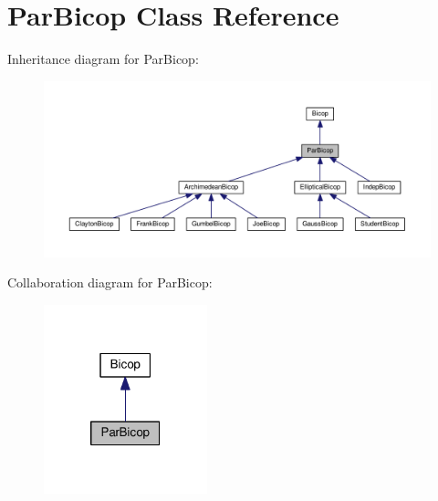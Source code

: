 \hypertarget{class_par_bicop}{\section{Par\+Bicop Class Reference}
\label{class_par_bicop}
}


Inheritance diagram for Par\+Bicop\+:\nopagebreak
\begin{figure}[H]
\begin{center}
\leavevmode
\includegraphics[width=350pt]{class_par_bicop__inherit__graph}
\end{center}
\end{figure}


Collaboration diagram for Par\+Bicop\+:\nopagebreak
\begin{figure}[H]
\begin{center}
\leavevmode
\includegraphics[width=134pt]{class_par_bicop__coll__graph}
\end{center}
\end{figure}
